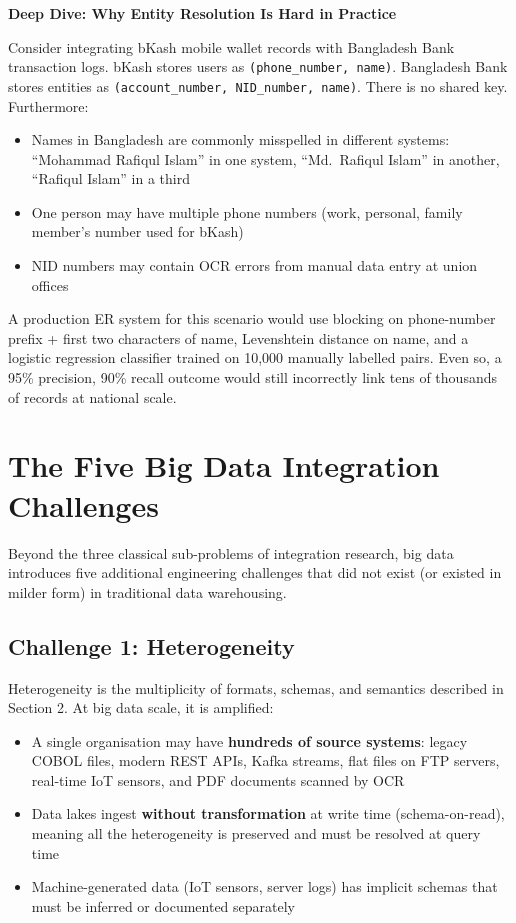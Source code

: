 \documentclass[12pt,a4paper]{article}
\newcommand{\deepdivebox}[2]{%
  \noindent
  \colorbox{PUOrange!12}{%
    \begin{minipage}{\dimexpr\linewidth-2\fboxsep}
      \vspace{4pt}\textbf{\textcolor{PUOrange!80!black}{Deep Dive: #1}}\par\vspace{2pt}
      #2\vspace{4pt}
    \end{minipage}%
  }\par\vspace{6pt}%
}
\begin{document}
\deepdivebox{Why Entity Resolution Is Hard in Practice}{Consider integrating bKash mobile wallet records with Bangladesh Bank transaction logs.  bKash stores users as \texttt{(phone\_number, name)}.  Bangladesh Bank stores entities as \texttt{(account\_number, NID\_number, name)}.  There is no shared key.  Furthermore:\begin{itemize}[nosep, leftmargin=1.5em, after=\vspace{2pt}]\item Names in Bangladesh are commonly misspelled in different systems: ``Mohammad Rafiqul Islam'' in one system, ``Md.\ Rafiqul Islam'' in another, ``Rafiqul Islam'' in a third \item One person may have multiple phone numbers (work, personal, family member's number used for bKash) \item NID numbers may contain OCR errors from manual data entry at union offices\end{itemize}A production ER system for this scenario would use blocking on phone-number prefix + first two characters of name, Levenshtein distance on name, and a logistic regression classifier trained on 10{,}000 manually labelled pairs. Even so, a 95\% precision, 90\% recall outcome would still incorrectly link tens of thousands of records at national scale.}

\section{The Five Big Data Integration Challenges}

Beyond the three classical sub-problems of integration research, big data introduces five additional engineering challenges that did not exist (or existed in milder form) in traditional data warehousing.

\subsection{Challenge 1: Heterogeneity}

Heterogeneity is the multiplicity of formats, schemas, and semantics described in Section 2.  At big data scale, it is amplified:
\begin{itemize}[leftmargin=1.8em]
  \item A single organisation may have \textbf{hundreds of source systems}: legacy COBOL files, modern REST APIs, Kafka streams, flat files on FTP servers, real-time IoT sensors, and PDF documents scanned by OCR
  \item Data lakes ingest \textbf{without transformation} at write time (schema-on-read), meaning all the heterogeneity is preserved and must be resolved at query time
  \item Machine-generated data (IoT sensors, server logs) has implicit schemas that must be inferred or documented separately
\end{itemize}
\end{document}
